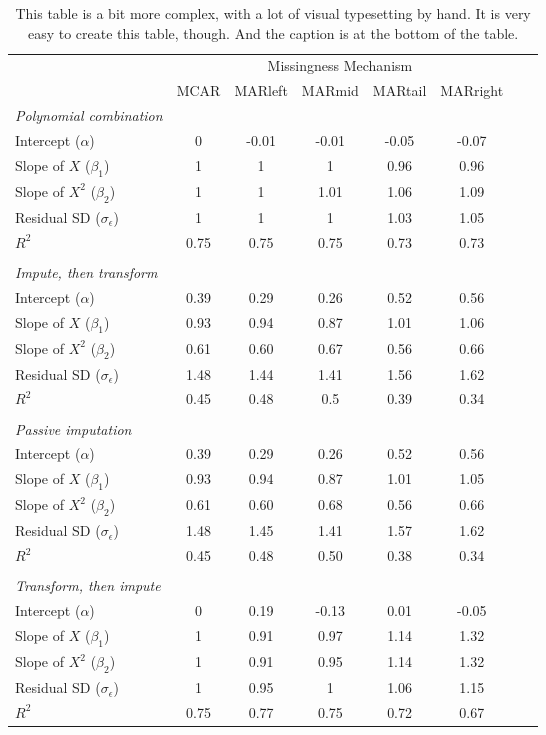 \documentclass[10pt, fullpage, a4paper, titlepage]{article}
\begin{document}
\begin{table}[h]
\begin{center}
\begin{tabular}{lcccccrl}
\hline
&\multicolumn{5}{c}{Missingness Mechanism} \\
\cline{2-6}
							&MCAR	&MARleft	&MARmid		&MARtail	& MARright\\
 \hline
\textit{Polynomial combination} &&&&&\\
Intercept ($\alpha$)				&0		&-0.01	&-0.01	&-0.05	&-0.07\\
Slope of $X$ ($\beta_1$)			&1		&1		&1		&0.96	&0.96\\	
Slope of $X^2$ ($\beta_2$)		&1		&1		&1.01	&1.06	&1.09\\	
Residual SD ($\sigma_\epsilon$) 	&1		&1		&1		&1.03	&1.05\\	
$R^2$						&0.75	&0.75	&0.75	&0.73	&0.73\\\\
\textit{Impute, then transform}	&&&&&\\
Intercept ($\alpha$)				&0.39	&0.29	&0.26	&0.52	&0.56\\
Slope of $X$ ($\beta_1$)			&0.93	&0.94	&0.87	&1.01	&1.06\\
Slope of $X^2$ ($\beta_2$)		&0.61	&0.60	&0.67	&0.56	&0.66\\
Residual SD ($\sigma_\epsilon$) 	&1.48	&1.44	&1.41	&1.56	&1.62\\
$R^2$						&0.45	&0.48	&0.5		&0.39	&0.34\\\\
\textit{Passive imputation}	&&&&&\\
Intercept ($\alpha$)				&0.39	&0.29	&0.26	&0.52	&0.56\\
Slope of $X$ ($\beta_1$)			&0.93	&0.94	&0.87	&1.01	&1.05\\
Slope of $X^2$ ($\beta_2$)		&0.61	&0.60	&0.68	&0.56	&0.66\\
Residual SD ($\sigma_\epsilon$) 	&1.48	&1.45	&1.41	&1.57	&1.62\\
$R^2$						&0.45	&0.48	&0.50	&0.38	&0.34\\\\
\textit{Transform, then impute}	&&&&&\\
Intercept ($\alpha$)				&0		&0.19	&-0.13	&0.01	&-0.05\\
Slope of $X$ ($\beta_1$)			&1		&0.91	&0.97	&1.14	&1.32\\
Slope of $X^2$ ($\beta_2$)		&1		&0.91	&0.95	&1.14	&1.32\\
Residual SD ($\sigma_\epsilon$) 	&1		&0.95	&1		&1.06	&1.15\\
$R^2$						&0.75	&0.77	&0.75	&0.72	&0.67\\\hline
\end{tabular}
\caption{This table is a bit more complex, with a lot of visual typesetting by hand. It is very easy to create this table, though. And the caption is at the bottom of the table.}
\label{tab}
\end{center}
\end{table}
\end{document}
